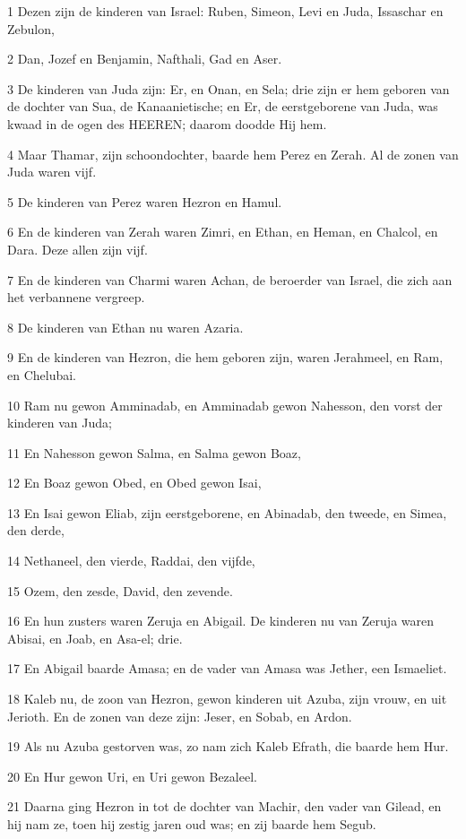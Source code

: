 \par 1 Dezen zijn de kinderen van Israel: Ruben, Simeon, Levi en Juda, Issaschar en Zebulon,
\par 2 Dan, Jozef en Benjamin, Nafthali, Gad en Aser.
\par 3 De kinderen van Juda zijn: Er, en Onan, en Sela; drie zijn er hem geboren van de dochter van Sua, de Kanaanietische; en Er, de eerstgeborene van Juda, was kwaad in de ogen des HEEREN; daarom doodde Hij hem.
\par 4 Maar Thamar, zijn schoondochter, baarde hem Perez en Zerah. Al de zonen van Juda waren vijf.
\par 5 De kinderen van Perez waren Hezron en Hamul.
\par 6 En de kinderen van Zerah waren Zimri, en Ethan, en Heman, en Chalcol, en Dara. Deze allen zijn vijf.
\par 7 En de kinderen van Charmi waren Achan, de beroerder van Israel, die zich aan het verbannene vergreep.
\par 8 De kinderen van Ethan nu waren Azaria.
\par 9 En de kinderen van Hezron, die hem geboren zijn, waren Jerahmeel, en Ram, en Chelubai.
\par 10 Ram nu gewon Amminadab, en Amminadab gewon Nahesson, den vorst der kinderen van Juda;
\par 11 En Nahesson gewon Salma, en Salma gewon Boaz,
\par 12 En Boaz gewon Obed, en Obed gewon Isai,
\par 13 En Isai gewon Eliab, zijn eerstgeborene, en Abinadab, den tweede, en Simea, den derde,
\par 14 Nethaneel, den vierde, Raddai, den vijfde,
\par 15 Ozem, den zesde, David, den zevende.
\par 16 En hun zusters waren Zeruja en Abigail. De kinderen nu van Zeruja waren Abisai, en Joab, en Asa-el; drie.
\par 17 En Abigail baarde Amasa; en de vader van Amasa was Jether, een Ismaeliet.
\par 18 Kaleb nu, de zoon van Hezron, gewon kinderen uit Azuba, zijn vrouw, en uit Jerioth. En de zonen van deze zijn: Jeser, en Sobab, en Ardon.
\par 19 Als nu Azuba gestorven was, zo nam zich Kaleb Efrath, die baarde hem Hur.
\par 20 En Hur gewon Uri, en Uri gewon Bezaleel.
\par 21 Daarna ging Hezron in tot de dochter van Machir, den vader van Gilead, en hij nam ze, toen hij zestig jaren oud was; en zij baarde hem Segub.
